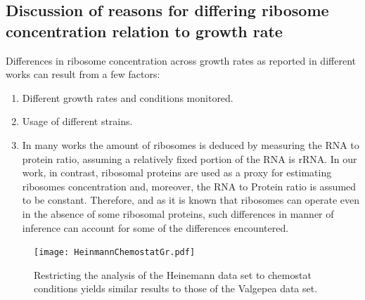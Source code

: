 \documentclass[notitlepage]{article}
\begin{document}
\subsection{Discussion of reasons for differing ribosome concentration relation to growth rate}
\label{ribosomeconc}
Differences in ribosome concentration  across growth rates as reported in different works can result from a few factors:
\begin{enumerate}
\item Different growth rates and conditions monitored.
\item Usage of different strains.
\item In many works the amount of ribosomes is deduced by measuring the RNA to protein ratio, assuming a relatively fixed portion of the RNA is rRNA.
In our work, in contrast, ribosomal proteins are used as a proxy for estimating ribosomes concentration and, moreover, the RNA to Protein ratio is assumed to be constant.
Therefore, and as it is known that ribosomes can operate even in the absence of some ribosomal proteins, such differences in manner of inference can account for some of the differences encountered.
\end{enumerate}

\begin{figure}[h]
\centering
\texttt{[image: HeinmannChemostatGr.pdf]}
\caption{
  Restricting the analysis of the Heinemann data set to chemostat conditions yields similar results to those of the Valgepea data set.
}
\label{fig:growthcorrchemo}
\end{figure}

\printbibliography
\end{document}
